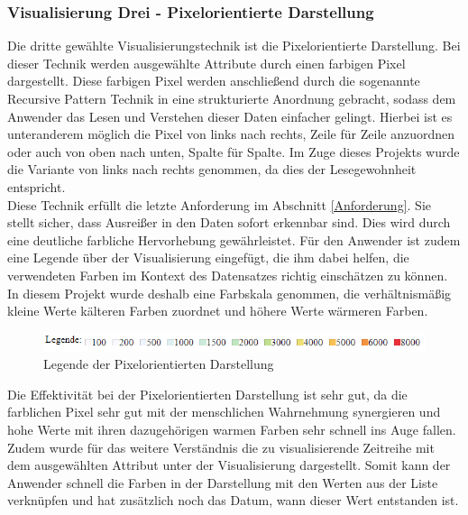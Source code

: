 \documentclass[usegeometry=true]{scrartcl}
\begin{document}
\subsubsection{Visualisierung Drei - Pixelorientierte Darstellung}\label{Visualisierung3}
Die dritte gewählte Visualisierungstechnik ist die Pixelorientierte Darstellung. Bei dieser Technik werden ausgewählte Attribute durch einen farbigen Pixel dargestellt. Diese
farbigen Pixel werden anschließend durch die sogenannte Recursive Pattern Technik in eine strukturierte Anordnung gebracht, sodass dem Anwender das Lesen und Verstehen dieser
Daten einfacher gelingt. \cite[5]{Kriegel1996Visua-5711} Hierbei ist es unteranderem möglich die Pixel von links nach rechts, Zeile für Zeile anzuordnen oder auch von oben nach
unten, Spalte für Spalte.\cite[2]{485140} Im Zuge dieses Projekts wurde die Variante von links nach rechts genommen, da dies der Lesegewohnheit entspricht. \\
Diese Technik erfüllt die letzte Anforderung im Abschnitt \ref{Anforderung}. Sie stellt sicher, dass Ausreißer in den Daten sofort erkennbar sind. Dies wird durch
eine deutliche farbliche Hervorhebung gewährleistet. Für den Anwender ist zudem eine Legende über der Visualisierung eingefügt, die ihm dabei helfen, die verwendeten Farben im
Kontext des Datensatzes richtig einschätzen zu können. In diesem Projekt wurde deshalb eine Farbskala genommen, die verhältnismäßig kleine Werte kälteren Farben zuordnet und höhere
Werte wärmeren Farben.\\
\begin{figure} [H]
	\begin{center}
		\includegraphics[width=15cm]{IMG/LegendePixel.png}
		\caption{Legende der Pixelorientierten Darstellung}
		\label{fig:LegendePixel}
	\end{center}
\end{figure}

\noindent Die Effektivität bei der Pixelorientierten Darstellung ist sehr gut, da die farblichen Pixel sehr gut mit der menschlichen Wahrnehmung synergieren und hohe Werte mit ihren
dazugehörigen warmen Farben sehr schnell ins Auge fallen. Zudem wurde für das weitere Verständnis die zu visualisierende Zeitreihe mit dem ausgewählten Attribut unter der
Visualisierung dargestellt. Somit kann der Anwender schnell die Farben in der Darstellung mit den Werten aus der Liste verknüpfen und hat zusätzlich noch das Datum, wann dieser
Wert entstanden ist.\\
\end{document}
